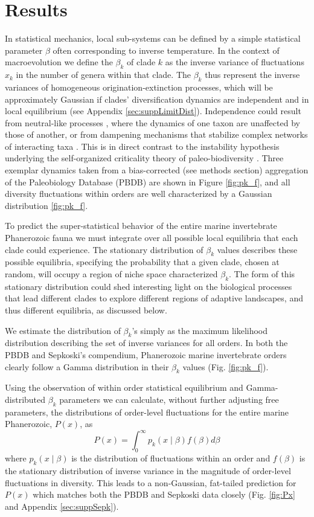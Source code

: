 \documentclass[12pt]{article}
\let\citep=\autocite
\begin{document}
\section*{Results}

In statistical mechanics, local sub-systems can be defined by a simple
statistical parameter $\beta$ often corresponding to inverse
temperature. In the context of macroevolution we define the $\beta_k$
of clade $k$ as the inverse variance of fluctuations $x_k$ in the
number of genera within that clade.  The $\beta_k$ thus represent the
inverse variances of homogeneous origination-extinction processes,
which will be approximately Gaussian if clades' diversification
dynamics are independent and in local equilibrium (see Appendix
\ref{sec:suppLimitDist}).  Independence could result from neutral-like
processes \citep{hubbell2001}, where the dynamics of one taxon are
unaffected by those of another, or from dampening mechanisms that
stabilize complex networks of interacting taxa \citep{brose2005}. This
is in direct contrast to the instability hypothesis underlying the
self-organized criticality theory of paleo-biodiversity
\citep{bak1993, sole1997}. Three exemplar dynamics taken from a
bias-corrected (see methods section) aggregation of the Paleobiology
Database (PBDB) \citep{alroy08} are shown in Figure \ref{fig:pk_f},
and all diversity fluctuations within orders are well characterized by
a Gaussian distribution \ref{fig:pk_f}.

To predict the super-statistical behavior of the entire marine
invertebrate Phanerozoic fauna we must integrate over all possible
local equilibria that each clade could experience. The stationary
distribution of $\beta_k$ values describes these possible equilibria,
specifying the probability that a given clade, chosen at random, will
occupy a region of niche space characterized $\beta_k$. The form of
this stationary distribution could shed
interesting light on the biological processes that lead different
clades to explore different regions of adaptive landscapes, and thus
different equilibria, as discussed below.

We estimate the distribution of $\beta_k$'s simply as the maximum
likelihood distribution describing the set of inverse variances for
all orders. In both the PBDB and Sepkoski's compendium, Phanerozoic
marine invertebrate orders clearly follow a Gamma distribution in
their $\beta_k$ values (Fig. \ref{fig:pk_f}).  

Using the observation of within order statistical equilibrium and
Gamma-distributed $\beta_k$ parameters we can calculate, without
further adjusting free parameters, the distributions of order-level
fluctuations for the entire marine Phanerozoic, $P(x)$, as
\begin{equation}
  P(x) = \int_0^\infty p_k(x \mid \beta) f(\beta) d\beta \label{eq:PxInt}
\end{equation}
where $p_k(x \mid \beta)$ is the distribution of fluctuations within
an order and $f(\beta)$ is the stationary distribution of inverse
variance in the magnitude of order-level fluctuations in
diversity. This leads to a non-Gaussian, fat-tailed prediction for
$P(x)$ which matches both the PBDB and Sepkoski data closely
(Fig. \ref{fig:Px} and Appendix \ref{sec:suppSepk}).
\end{document}
